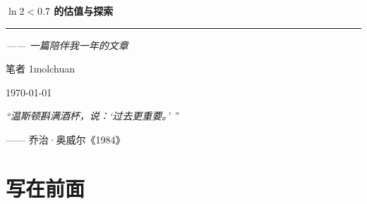 \documentclass[12pt]{article}
\theoremstyle{definition}
\theoremstyle{plain}
\theoremstyle{definition}
\begin{document}

\begin{titlepage}
    \centering
    \vspace*{6cm} %
    
    {\Huge \bfseries $\ln 2 < 0.7$ 的估值与探索 \par} %
    
    \vspace{1.5cm} %
    
    \rule{0.8\textwidth}{1pt} %
    
    \vspace{0.8cm} %
    
    {\Large \itshape —— 一篇陪伴我一年的文章 \par} %
    
    \vfill %
    
    {\large 笔者 1molchuan\par}
    \vspace{0.5cm}
    {\large \today \par}
    
    \vspace*{3cm} %
\end{titlepage}

\newpage

\newpage
\thispagestyle{empty} %

\vspace*{\fill} %

\begin{center}
    \begin{minipage}{0.7\textwidth} %
        \centering
        \large\itshape
        ``温斯顿斟满酒杯，说：`过去更重要。' ''
        \par
        \vspace{1em}
        \hfill —— 乔治·奥威尔《1984》
    \end{minipage}
\end{center}

\vspace*{\fill} %
\newpage

\tableofcontents
\newpage

\section*{写在前面}
\end{document}

